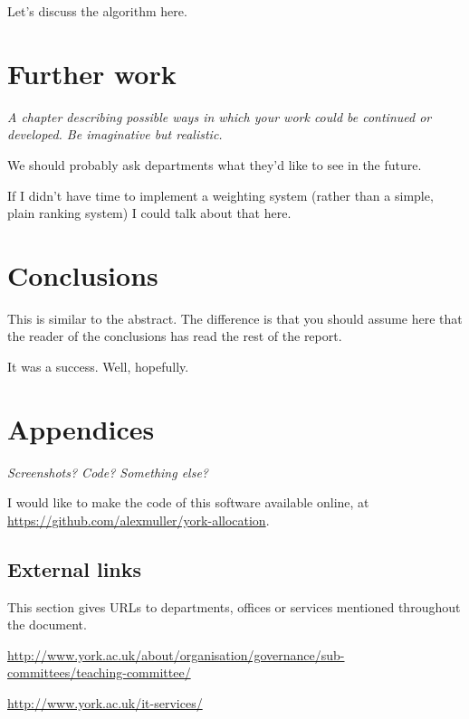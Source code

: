 \documentclass[]{article}
\begin{document}
Let's discuss the algorithm here.

\section{Further work}

\textit{A chapter describing possible ways in which your work could be continued or developed. Be imaginative but realistic.}

We should probably ask departments what they'd like to see in the future.

If I didn't have time to implement a weighting system (rather than a simple, plain ranking system) I could talk about that here.

\section{Conclusions}

This is similar to the abstract. The difference is that you should assume here that the reader of the conclusions has read the rest of the report.

It was a success. Well, hopefully.

\section{Appendices}

\textit{Screenshots? Code? Something else?}

I would like to make the code of this software available online, at \url{https://github.com/alexmuller/york-allocation}.

\subsection{External links}

This section gives URLs to departments, offices or services mentioned throughout the document.

\url{http://www.york.ac.uk/about/organisation/governance/sub-committees/teaching-committee/}

\url{http://www.york.ac.uk/it-services/}

\newpage

\end{document}
